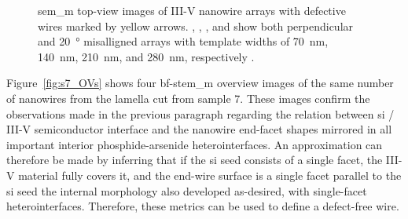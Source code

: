 \begin{figure}
{    }
    \caption[\acs{sem_m} images of nanowire arrays.]{\acs{sem_m} top-view images of III-V nanowire arrays with defective wires marked by yellow arrows. , , , and  show both perpendicular and \qty{20}{\degree} misalligned arrays with template widths of \qty{70}{nm}, \qty{140}{nm}, \qty{210}{nm}, and \qty{280}{nm}, respectively \cite{Brugnolotto2023_2}.}
    \label{fig:s7_arrays}
\end{figure}

Figure~\ref{fig:s7_OVs} shows four \acs{bf}-\acs{stem_m} overview images of the same number of nanowires from the lamella cut from sample 7. These images confirm the observations made in the previous paragraph regarding the relation between \acf{si} / III-V semiconductor interface and the nanowire end-facet shapes mirrored in all important interior phosphide-arsenide heterointerfaces. An approximation can therefore be made by inferring that if the \acl{si} seed consists of a single  facet, the III-V material fully covers it, and the end-wire surface is a single  facet parallel to the \acl{si} seed the internal morphology also developed as-desired, with  single-facet heterointerfaces. Therefore, these metrics can be used to define a defect-free wire.

